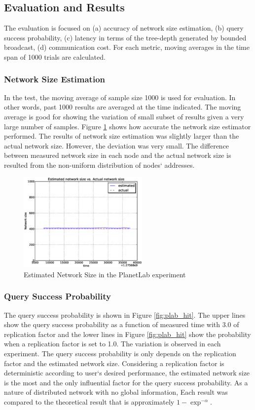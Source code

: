 \documentclass[9.5pt,journal,final,finalsubmission,twocolumn]{IEEEtran}
\begin{document}
\subsection{Evaluation and Results} \label{plab:result}
The evaluation is focused on (a) accuracy of network size estimation,
(b) query success probability, (c) latency in terms of the tree-depth
generated by bounded broadcast, (d) communication cost.
For each metric, moving averages 
in the time span of 1000 trials are calculated.

\subsubsection{Network Size Estimation}
In the test, the moving average of sample 
size 1000 is used for evaluation. 
In other words, past 1000 results are averaged at the time indicated. 
The moving average is good for showing the variation of small subset 
of results given a very large number of samples.
Figure \ref{fig:e_net_size} shows how accurate the network 
size estimator performed.
The results of network size estimation was slightly larger than 
the actual network size. However, the deviation was very small.  
The difference between measured network size in each node and the actual
network size is resulted from the non-uniform distribution of nodes` 
addresses.

\begin{figure}[ht]
\centering
\includegraphics[width=2.5in]{plab_size}
\caption{Estimated Network Size in the PlanetLab experiment}
\label{fig:e_net_size}
\end{figure}

\subsubsection{Query Success Probability}
The query success probability is shown in Figure \ref{fig:plab_hit}.
The upper lines show the query success probability as a function of measured time with
3.0 of replication factor and the lower lines in Figure \ref{fig:plab_hit} 
show the probability when a replication factor is set to 1.0.
The variation is observed in each experiment. The query success 
probability is only depends on the replication factor and the 
estimated network size. 
Considering a replication factor is deterministic according to user`s desired performance, 
the estimated network size is the most and the only influential factor 
for the query success probability. 
As a nature of distributed network with no global information, 
Each result was compared to the theoretical result that is approximately
$1-\exp^{-\alpha}$.
 
\end{document}
